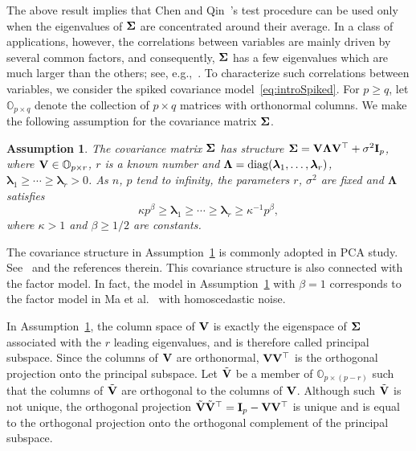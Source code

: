 \documentclass[times,sort&compress,3p]{elsarticle}
\newcommand{\mydiag}{ {\rm diag} }
\newcommand{\bfsym}[1]{\ensuremath{\boldsymbol{#1}}}
\def\blambda {\bfsym {\lambda}}        \def\bLambda {\bfsym {\Lambda}}
\theoremstyle{plain}
\newtheorem{assumption}{\quad\quad Assumption}
\theoremstyle{definition}
\theoremstyle{remark}
\begin{document}
    The above result implies that Chen and Qin~\cite{Chen2010A}'s test procedure can be used only when the eigenvalues of $\bSigma$ are concentrated around their average. 
   In a class of applications, however, the correlations between variables are mainly driven by several common factors, and consequently, $\bSigma$ has a few eigenvalues which are much larger than the others; see, e.g.,~\cite{Cai2012Sparse,Fan2015Asymptotics,Jung2009PCA}.
To characterize such correlations between variables, we consider the  spiked covariance model~\eqref{eq:introSpiked}.
For $p\geq q$, let $\mathbb{O}_{p\times q}$ denote the collection of $p\times q$ matrices with orthonormal columns.
We make the following assumption for the covariance matrix $\bSigma$.
\begin{assumption}\label{theModel}
    The covariance matrix $\bSigma$ has structure $ \bSigma=\BV\bLambda \BV^\top +\sigma^2 \BI_p$, where $\mathbf{V}\in\mathbb{O}_{p\times r}$, $r$ is a known number and $\bLambda=\mydiag(\blambda_{1},\ldots,\blambda_{r})$, 
 $\blambda_{1}\geq \cdots \geq \blambda_{r}>0$.
As $n$, $p$ tend to infinity, the parameters
$r$, $\sigma^2$ are fixed and $\bLambda$ satisfies     
    \begin{equation*}
        \kappa p^{\beta}\geq \blambda_{1}\geq \cdots \geq\blambda_{r}\geq \kappa^{-1}p^{\beta},
\end{equation*}
where $\kappa>1$ and $\beta\geq {1}/{2}$ are constants.
\end{assumption}

The covariance structure in Assumption~\ref{theModel} is commonly adopted in PCA study.
See~\cite{Birnbaum2013,Cai2012Sparse,Passemier2015} and the references therein.
This covariance structure is also connected with the factor model.
In fact, the model in Assumption~\ref{theModel} with $\beta=1$
corresponds to the factor model in Ma {\rm et al.}~\cite{Ma2015A} with homoscedastic noise.

In Assumption~\ref{theModel}, the column space of $\mathbf{V}$ is exactly the eigenspace of $\bSigma$ associated with the $r$ leading eigenvalues, and is therefore called principal subspace. Since the columns of $\mathbf{V}$ are orthonormal, $\mathbf{V} \mathbf{V}^\top $ is the orthogonal projection onto the principal subspace.
Let $\tilde{\mathbf{V}}$ be a member of $\mathbb{O}_{p\times (p-r)}$ such that the columns of $\tilde{\mathbf{V}}$ are orthogonal to the columns of  $\mathbf{V}$.
 Although such $\tilde{\mathbf{V}}$ is not unique, the orthogonal projection  $\tilde{\mathbf{V}}\tilde{\mathbf{V}}^\top =\mathbf{I}_p-\mathbf{V} \mathbf{V}^\top $ is unique and is equal to the orthogonal projection onto the orthogonal complement of the principal subspace.
\end{document}
